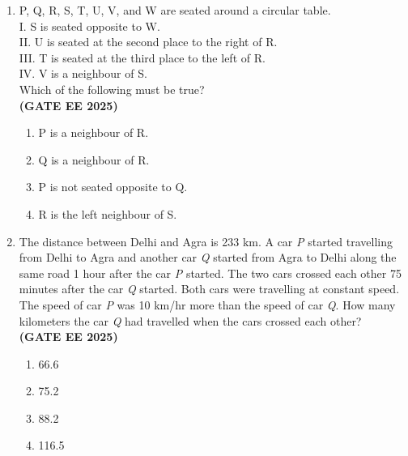 \documentclass[journal,12pt,onecolumn]{IEEEtran}
\theoremstyle{remark}
\begin{document}
\begin{enumerate}
\item P, Q, R, S, T, U, V, and W are seated around a circular table. \\
I. S is seated opposite to W. \\
II. U is seated at the second place to the right of R. \\
III. T is seated at the third place to the left of R. \\
IV. V is a neighbour of S. \\

Which of the following must be true? \\ \hfill \textbf{(GATE EE 2025)}
\begin{enumerate}
\item P is a neighbour of R.
\item Q is a neighbour of R.
\item P is not seated opposite to Q.
\item R is the left neighbour of S.
\end{enumerate}


\item The distance between Delhi and Agra is 233 km. A car \textit{P} started travelling from Delhi to Agra and another car \textit{Q} started from Agra to Delhi along the same road 1 hour after the car \textit{P} started. The two cars crossed each other 75 minutes after the car \textit{Q} started. Both cars were travelling at constant speed. The speed of car \textit{P} was 10 km/hr more than the speed of car \textit{Q}. How many kilometers the car \textit{Q} had travelled when the cars crossed each other? \\
\hfill \textbf{(GATE EE 2025)}
\begin{enumerate}
\item 66.6
\item 75.2
\item 88.2
\item 116.5
\end{enumerate}



\end{enumerate}
\end{document}
